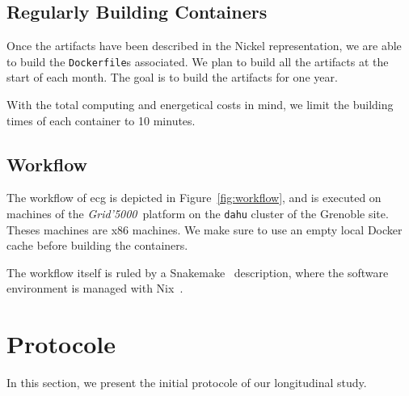 \documentclass[sigconf,natbib=false]{acmart}
\newcommand{\grid}{\emph{Grid'5000}}
\newcommand{\df}{\texttt{Dockerfile}}
\newcommand{\ecg}{\texttt{ecg}}
\newcommand{\todo}[1]{{\color{red}{TODO: #1}}}
\begin{document}
\subsection{Regularly Building Containers}

Once the artifacts have been described in the Nickel representation, we are able to build the \df s associated.
We plan to build all the artifacts at the start of each month.
The goal is to build the artifacts for one year.

\todo{building patterns, exponential decay}


With the total computing and energetical costs in mind, we limit the building times of each container to 10 minutes.


\subsection{Workflow}

\begin{figure*}
  \centering
  \caption{
    Workflow of \ecg.
    Each description of an artifact is verified with the Nickel contract and then converted in a JSON representation.
    This JSON representation is then read by \ecg\ to
    \textit{(i)} download the artifact,
    \textit{(ii)} compute the hash of its content,
    \textit{(iii)} build the container from the \df, and
    \textit{(iv)} extract the software environment information from the built container.
    \ecg\ outputs files containing the information about the artifact and its \df\ .
  }
  \label{fig:workflow}
\end{figure*}

The workflow of ecg is depicted in Figure~\ref{fig:workflow}, and is executed on machines of the \grid\ platform \cite{grid5000} on the \texttt{dahu} cluster of the Grenoble site.
Theses machines are x86 machines.
We make sure to use an empty local Docker cache before building the containers.

The workflow itself is ruled by a Snakemake~\cite{koster2012snakemake} description, where the software environment is managed with Nix~\cite{dolstra_nix_2004}.


\section{Protocole}

In this section, we present the initial protocole of our longitudinal study.
\end{document}
